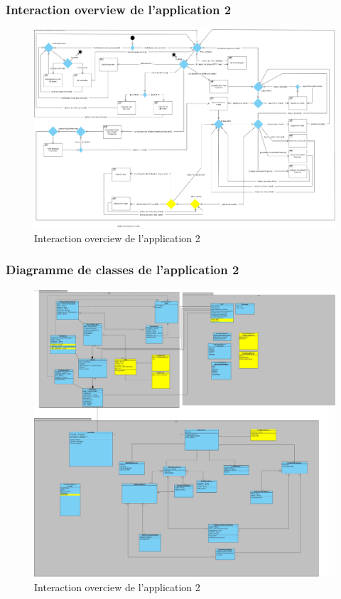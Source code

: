 \documentclass[../rapport.tex]{subfiles}
\begin{document}
\subsubsection{Interaction overview de l'application 2}
	\begin{figure}[h!]
		\centering\includegraphics[scale=0.15]{ressources/photos_diagrammes/extensionTheo/diagrams2/interactionOverview2.jpg}
		\caption{Interaction overciew de l'application 2}
	\end{figure}
\subsubsection{Diagramme de classes de l'application 2}
	\begin{figure}[h!]
		\centering\includegraphics[scale=0.15]{ressources/photos_diagrammes/extensionTheo/diagrams2/classDiagram2.jpg}
		\caption{Interaction overciew de l'application 2}
	\end{figure}
\end{document}
